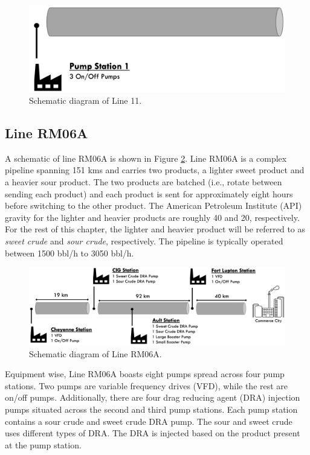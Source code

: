 \begin{figure}[h]
    \centering
    \includegraphics[scale=0.45]{images/08Line11.png}
    \caption{Schematic diagram of Line 11.}
    \label{fig:08Line11}
\end{figure}


\subsection{Line RM06A}
A schematic of line RM06A is shown in Figure \ref{fig:08RM06A}.  Line RM06A is a complex pipeline spanning 151 kms and carries two products, a lighter sweet product and a heavier sour product. The two products are batched (i.e., rotate between sending each product) and each product is sent for approximately eight hours before switching to the other product. The American Petroleum Institute (API) gravity for the lighter and heavier products are roughly 40 and 20, respectively. For the rest of this chapter, the lighter and heavier product will be referred to as \textit{sweet crude} and \textit{sour crude}, respectively. The pipeline is typically operated between 1500 bbl/h to 3050 bbl/h. 

\begin{figure}[h]
    \centering
    \includegraphics[scale=0.35]{images/08RM06A.png}
    \caption{Schematic diagram of Line RM06A.}
    \label{fig:08RM06A}
\end{figure}

Equipment wise, Line RM06A boasts eight pumps spread across four pump stations. Two pumps are variable frequency drives (VFD), while the rest are on/off pumps. Additionally, there are four drag reducing agent (DRA) injection pumps situated across the second and third pump stations. Each pump station contains a sour crude and sweet crude DRA pump. The sour and sweet crude uses different types of DRA.  The DRA is injected based on the product present at the pump station. 

